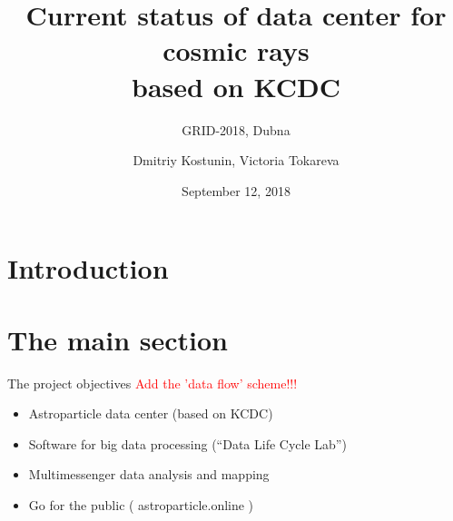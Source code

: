 \documentclass[18pt]{beamer}
\title[Cosmic rays data center]{Current status of data center for cosmic rays \\based on KCDC}
\subtitle{GRID-2018, Dubna}
\author{Dmitriy Kostunin, Victoria Tokareva}
\institute{Institute for Nuclear Physics (IKP)}
\date{September 12, 2018}
\begin{document}

\section{Introduction}


\section{The main section}

\begin{frame}{The project objectives}
\textcolor{red}{Add the 'data flow' scheme!!!}
\begin{itemize}
 \item Astroparticle data center (based on KCDC)
 \item Software for big data processing (“Data Life Cycle Lab”)
 \item Multimessenger data analysis and mapping
 \item Go for the public ( astroparticle.online )
\end{itemize}
\end{frame}
\end{document}
